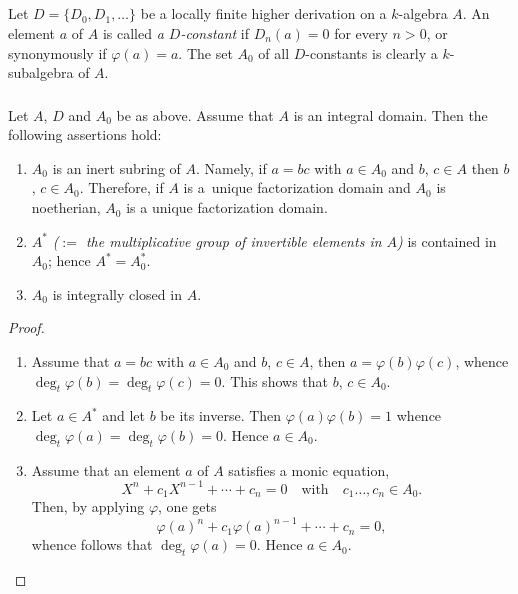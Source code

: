 \subsection{}\label{chap1:1.3}
Let $D=\{D_{0},D_{1},\ldots\}$ be a locally finite higher derivation
on a $k$-algebra $A$. An element $a$ of $A$ is called {\em a
  $D$-constant} if $D_{n}(a)=0$ for every $n>0$, or synonymously if
$\varphi(a)=a$. The set $A_{0}$ of all $D$-constants is clearly a
$k$-subalgebra of $A$.

\subsubsection{}\label{chap1:1.3.1}
\begin{lemma*}
  Let $A$, $D$ and $A_{0}$ be as above. Assume that $A$ is an integral
  domain. Then the following assertions hold:
  \begin{enumerate}
    \renewcommand{\labelenumi}{\rm(\theenumi)}
  \item $A_{0}$ is an inert subring of $A$. Namely, if $a=bc$ with $a\in
    A_{0}$ and $b$, $c\in A$ then $b$, $c\in A_{0}$. Therefore, if $A$
    is a\pageoriginale\ unique factorization domain and $A_{0}$ is
    noetherian, $A_{0}$ is a unique factorization domain.
    
  \item $A^{\ast}$ {\em ($:=$ the multiplicative group of invertible elements
    in $A$)} is contained in $A_{0}$; hence $A^{\ast}=A^{\ast}_{0}$.
    
  \item $A_{0}$ is integrally closed in $A$.
  \end{enumerate}
\end{lemma*}

\begin{proof}
\begin{enumerate}
\renewcommand{\labelenumi}{\rm(\theenumi)}
\item Assume that $a=bc$ with $a\in A_{0}$ and $b$, $c\in A$, then
  $a=\varphi(b)\varphi(c)$, whence
  $\deg_{t}\varphi(b)=\deg_{t}\varphi(c)=0$. This shows that $b$,
  $c\in A_{0}$.

\item Let $a\in A^{\ast}$ and let $b$ be its inverse. Then
  $\varphi(a)\varphi(b)=1$ whence
  $\deg_{t}\varphi(a)=\deg_{t}\varphi(b)=0$. Hence $a\in A_{0}$.

\item Assume that an element $a$ of $A$ satisfies a monic equation,
$$
X^{n}+c_{1}X^{n-1}+\cdots+c_{n}=0\quad\text{with}\quad
c_{1}\ldots,c_{n}\in A_{0}.
$$
Then, by applying $\varphi$, one gets
$$
\varphi(a)^{n}+c_{1}\varphi(a)^{n-1}+\cdots+c_{n}=0,
$$
whence follows that $\deg_{t}\varphi(a)=0$. Hence $a\in A_{0}$.
\end{enumerate}
\end{proof}


